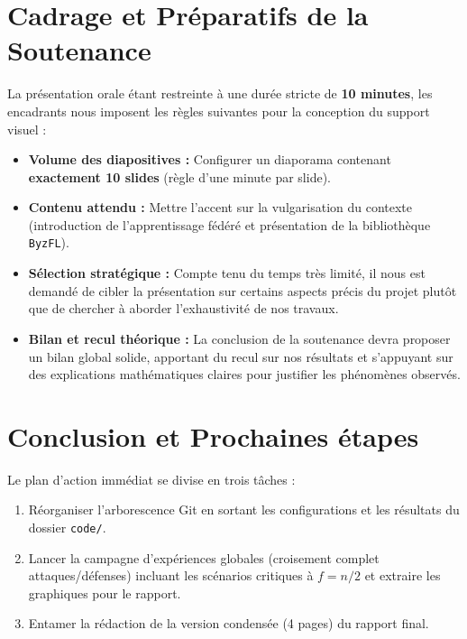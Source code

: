 \documentclass[11pt, a4paper]{article}
\begin{document}
\section{Cadrage et Préparatifs de la Soutenance}
La présentation orale étant restreinte à une durée stricte de \textbf{10 minutes}, les encadrants nous imposent les règles suivantes pour la conception du support visuel :
\begin{itemize}
    \item \textbf{Volume des diapositives :} Configurer un diaporama contenant \textbf{exactement 10 slides} (règle d'une minute par slide).
    \item \textbf{Contenu attendu :} Mettre l'accent sur la vulgarisation du contexte (introduction de l'apprentissage fédéré et présentation de la bibliothèque \texttt{ByzFL}).
    \item \textbf{Sélection stratégique :} Compte tenu du temps très limité, il nous est demandé de cibler la présentation sur certains aspects précis du projet plutôt que de chercher à aborder l'exhaustivité de nos travaux.
    \item \textbf{Bilan et recul théorique :} La conclusion de la soutenance devra proposer un bilan global solide, apportant du recul sur nos résultats et s'appuyant sur des explications mathématiques claires pour justifier les phénomènes observés.
\end{itemize}

\section{Conclusion et Prochaines étapes}
Le plan d'action immédiat se divise en trois tâches :
\begin{enumerate}
    \item Réorganiser l'arborescence Git en sortant les configurations et les résultats du dossier \texttt{code/}.
    \item Lancer la campagne d'expériences globales (croisement complet attaques/défenses) incluant les scénarios critiques à $f = n/2$ et extraire les graphiques pour le rapport.
    \item Entamer la rédaction de la version condensée (4 pages) du rapport final.
\end{enumerate}
\end{document}
